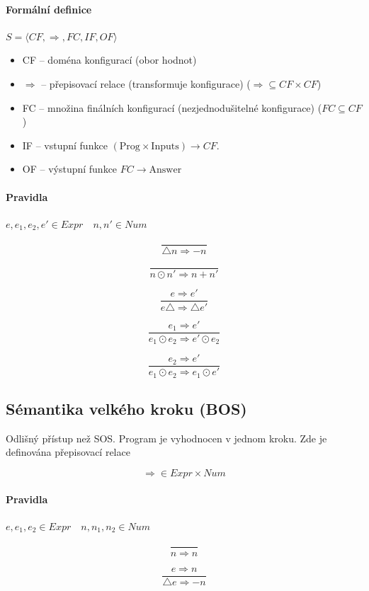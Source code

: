 \paragraph{Formální definice} $S = \langle CF,\Rightarrow, FC, IF, OF \rangle$

\begin{itemize}[itemsep=0px]
\item CF – doména konfigurací (obor hodnot)
\item $\Rightarrow$ – přepisovací relace (transformuje konfigurace) ($\Rightarrow \subseteq CF \times CF$)
\item FC – množina finálních konfigurací (nezjednodušitelné konfigurace) ($FC\subseteq CF$)
\item IF – vstupní funkce $(\text{Prog} \times \text{Inputs}) \rightarrow CF$.
\item OF – výstupní funkce $FC \rightarrow \text{Answer}$
\end{itemize}

\paragraph{Pravidla} $e,e_1,e_2,e' \in Expr \quad n,n' \in Num$

$$\frac{}{\bigtriangleup n \Rightarrow -n}$$

$$\frac{}{n \odot n' \Rightarrow n + n'}$$

$$\frac{e \Rightarrow e'}{e \bigtriangleup \Rightarrow \bigtriangleup e'}$$

$$\frac{e_1 \Rightarrow e'}{e_1 \odot e_2 \Rightarrow e' \odot e_2}$$

$$\frac{e_2 \Rightarrow e'}{e_1 \odot e_2 \Rightarrow e_1 \odot e'}$$

\subsection{Sémantika velkého kroku (BOS)}
\noindent Odlišný přístup než SOS. Program je vyhodnocen v jednom kroku. Zde je definována přepisovací relace

$$\Longrightarrow \in Expr \times Num$$

\paragraph{Pravidla} $e,e_1,e_2 \in Expr \quad n,n_1,n_2 \in Num$

$$\frac{}{n \Longrightarrow n}$$

$$\frac{e \Longrightarrow n}{\bigtriangleup e \Longrightarrow -n}$$

